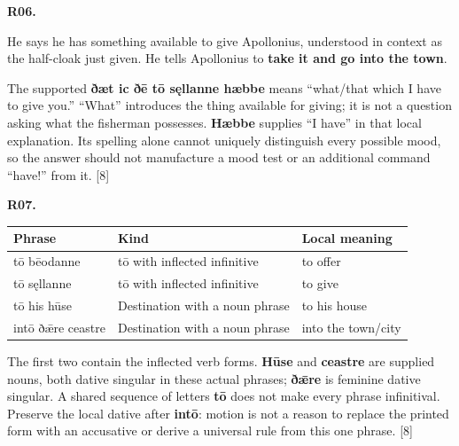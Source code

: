 \par\begin{minipage}{\linewidth}\raggedright
\textbf{R06.}

He says he has something available to give Apollonius, understood in context as the half-cloak just given. He tells Apollonius to \textbf{take it and go into the town}.

The supported \textbf{ðæt ic ðē tō sęllanne hæbbe} means “what/\allowbreak{}that which I have to give you.” “What” introduces the thing available for giving; it is not a question asking what the fisherman possesses. \textbf{Hæbbe} supplies “I have” in that local explanation. Its spelling alone cannot uniquely distinguish every possible mood, so the answer should not manufacture a mood test or an additional command “have!” from it. [8]

\end{minipage}\par\addvspace{4pt}

\par\begin{minipage}{\linewidth}\raggedright
\textbf{R07.}

\par\begingroup
\fontsize{10.5}{13.2}\selectfont
\setlength{\LTleft}{0pt}\setlength{\LTright}{\fill}
\noindent
\begin{tabular}{@{}>{\raggedright\arraybackslash}p{31.95mm}>{\raggedright\arraybackslash}p{51.83mm}>{\raggedright\arraybackslash}p{34.6mm}@{}}
\toprule
\textbf{Phrase} & \textbf{Kind} & \textbf{Local meaning} \\
\midrule
tō bēodanne & tō with inflected infinitive & to offer \\
tō sęllanne & tō with inflected infinitive & to give \\
tō his hūse & Destination with a noun phrase & to his house \\
intō ðǣre ceastre & Destination with a noun phrase & into the town/\allowbreak{}city \\
\bottomrule
\end{tabular}
\par\endgroup

The first two contain the inflected verb forms. \textbf{Hūse} and \textbf{ceastre} are supplied nouns, both dative singular in these actual phrases; \textbf{ðǣre} is feminine dative singular. A shared sequence of letters \textbf{tō} does not make every phrase infinitival. Preserve the local dative after \textbf{intō}: motion is not a reason to replace the printed form with an accusative or derive a universal rule from this one phrase. [8]

\end{minipage}\par\addvspace{4pt}

